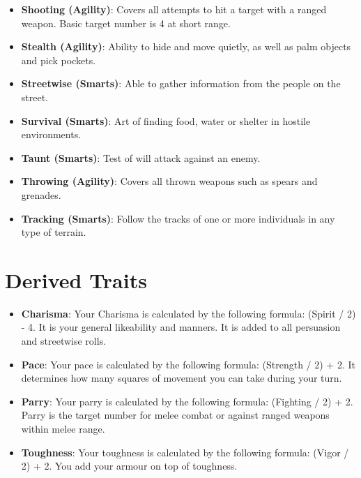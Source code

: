 \documentclass[10pt,twoside]{article}
\begin{document}
\begin{multicols}{2}
\begin{itemize}
\item \textbf{Shooting (Agility)}: Covers all attempts to hit a target with a ranged weapon. Basic target number is 4 at short range.

\item \textbf{Stealth (Agility)}: Ability to hide and move quietly, as well as palm objects and pick pockets.

\item \textbf{Streetwise (Smarts)}: Able to gather information from the people on the street.

\item \textbf{Survival (Smarts)}: Art of finding food, water or shelter in hostile environments.

\item \textbf{Taunt (Smarts)}: Test of will attack against an enemy.

\item \textbf{Throwing (Agility)}: Covers all thrown weapons such as spears and grenades.

\item \textbf{Tracking (Smarts)}: Follow the tracks of one or more individuals in any type of terrain.

\end{itemize}


\section{Derived Traits}

\begin{itemize}

\item \textbf{Charisma}: Your Charisma is calculated by the following formula: (Spirit / 2) - 4. It is your general likeability and manners. It is added to all persuasion and streetwise rolls.

\item \textbf{Pace}: Your pace is calculated by the following formula: (Strength / 2) + 2. It determines how many squares of movement you can take during your turn.

\item \textbf{Parry}: Your parry is calculated by the following formula: (Fighting / 2) + 2. Parry is the target number for melee combat or against ranged weapons within melee range.

\item \textbf{Toughness}: Your toughness is calculated by the following formula: (Vigor / 2) + 2. You add your armour on top of toughness.


\end{itemize}
\end{multicols}
\end{document}
